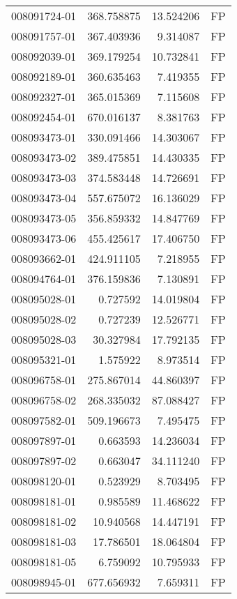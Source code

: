\begin{tabular}{lrrl}
008091724-01 &  368.758875 &    13.524206 &   FP \\
008091757-01 &  367.403936 &     9.314087 &   FP \\
008092039-01 &  369.179254 &    10.732841 &   FP \\
008092189-01 &  360.635463 &     7.419355 &   FP \\
008092327-01 &  365.015369 &     7.115608 &   FP \\
008092454-01 &  670.016137 &     8.381763 &   FP \\
008093473-01 &  330.091466 &    14.303067 &   FP \\
008093473-02 &  389.475851 &    14.430335 &   FP \\
008093473-03 &  374.583448 &    14.726691 &   FP \\
008093473-04 &  557.675072 &    16.136029 &   FP \\
008093473-05 &  356.859332 &    14.847769 &   FP \\
008093473-06 &  455.425617 &    17.406750 &   FP \\
008093662-01 &  424.911105 &     7.218955 &   FP \\
008094764-01 &  376.159836 &     7.130891 &   FP \\
008095028-01 &    0.727592 &    14.019804 &   FP \\
008095028-02 &    0.727239 &    12.526771 &   FP \\
008095028-03 &   30.327984 &    17.792135 &   FP \\
008095321-01 &    1.575922 &     8.973514 &   FP \\
008096758-01 &  275.867014 &    44.860397 &   FP \\
008096758-02 &  268.335032 &    87.088427 &   FP \\
008097582-01 &  509.196673 &     7.495475 &   FP \\
008097897-01 &    0.663593 &    14.236034 &   FP \\
008097897-02 &    0.663047 &    34.111240 &   FP \\
008098120-01 &    0.523929 &     8.703495 &   FP \\
008098181-01 &    0.985589 &    11.468622 &   FP \\
008098181-02 &   10.940568 &    14.447191 &   FP \\
008098181-03 &   17.786501 &    18.064804 &   FP \\
008098181-05 &    6.759092 &    10.795933 &   FP \\
008098945-01 &  677.656932 &     7.659311 &   FP \\

\end{tabular}
